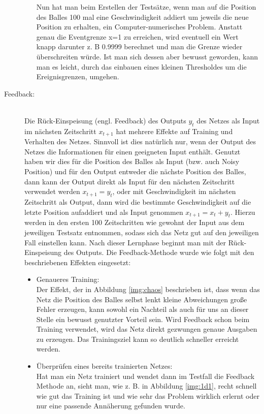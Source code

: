 \begin{description}
\begin{itemize}
		Nun hat man beim Erstellen der Testsätze, wenn man auf die Position des Balles 100 mal eine Geschwindigkeit addiert um jeweils die neue Position zu erhalten, ein Computer-numerisches Problem. Anstatt genau die Eventgrenze x=1 zu erreichen, wird eventuell ein Wert knapp darunter z. B 0.9999 berechnet und man die Grenze wieder überschreiten würde. Ist man sich dessen aber bewusst geworden, kann man es leicht, durch das einbauen eines kleinen Thresholdes um die Ereignisgrenzen, umgehen. 
	\end{itemize}
	\item[Feedback:]\hfill \\
	Die Rück-Einspeisung (engl. Feedback) des Outputs $ y_{t} $ des Netzes als Input im nächsten Zeitschritt $ x_{t+1} $ hat mehrere Effekte auf Training und Verhalten des Netzes. Sinnvoll ist dies natürlich nur, wenn der Output des Netzes die Informationen für einen geeigneten Input enthält. Genutzt haben wir dies für die Position des Balles als Input (bzw. auch Noisy Position) und für den Output entweder die nächste Position des Balles, dann kann der Output direkt als Input für den nächsten Zeitschritt verwendet werden $ x_{t+1} = y_{t} $, oder mit Geschwindigkeit im nächsten Zeitschritt als Output, dann wird die bestimmte Geschwindigkeit auf die letzte Position aufaddiert und als Input genommen  $ x_{t+1} = x_{t}+y_{t} $. Hierzu werden in den ersten 100 Zeitschritten wie gewohnt der Input aus dem jeweiligen Testsatz entnommen, sodass sich das Netz gut auf den jeweiligen Fall einstellen kann. Nach dieser Lernphase beginnt man mit der Rück-Einspeisung des Outputs. Die Feedback-Methode wurde wie folgt mit den beschriebenen Effekten eingesetzt: \hfill \\
	\begin{itemize}
		\item Genaueres Training: \hfill \\
		 Der Effekt, der in Abbildung \ref{img:chaos} beschrieben ist, dass wenn das Netz die Position des Balles selbst lenkt kleine Abweichungen große Fehler erzeugen, kann sowohl ein Nachteil als auch für uns an dieser Stelle ein bewusst genutzter Vorteil sein. Wird Feedback schon beim Training verwendet, wird das Netz direkt gezwungen genaue Ausgaben zu erzeugen. Das Trainingsziel kann so deutlich schneller erreicht werden. 
		\item Überprüfen eines bereits trainierten Netzes: \hfill \\
		 Hat man ein Netz trainiert und wendet dann im Testfall die Feedback Methode an, sieht man, wie z. B. in Abbildung \ref{img:1d1}, recht schnell wie gut das Training ist und wie sehr das Problem wirklich erlernt oder nur eine passende Annäherung gefunden wurde. 

\end{itemize}
\end{description}
